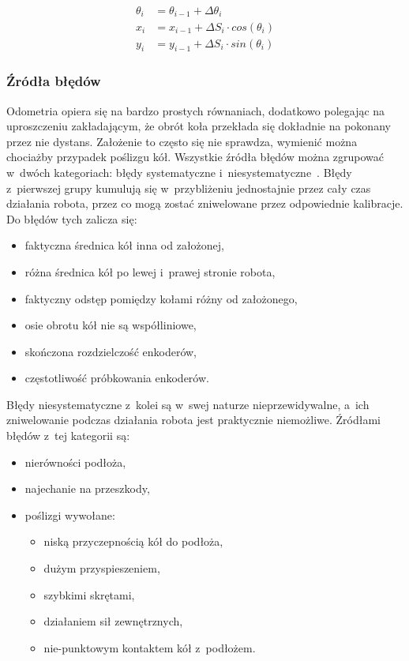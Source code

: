 \begin{align*}
\theta_i &= \theta_{i-1} + \Delta \theta_i \\
x_i &= x_{i-1} + \Delta S_i \cdot cos(\theta_i) \\
y_i &= y_{i-1} + \Delta S_i \cdot sin(\theta_i)
\end{align*}


\subsubsection{Źródła błędów}

Odometria opiera się na bardzo prostych równaniach, dodatkowo polegając na
uproszczeniu zakładającym, że obrót koła przekłada się dokładnie na pokonany
przez nie dystans. Założenie to często się nie sprawdza, wymienić można
chociażby przypadek poślizgu kół. Wszystkie źródła błędów można zgrupować 
w~dwóch kategoriach: błędy systematyczne i~niesystematyczne~\cite{whereami}.
Błędy z~pierwszej grupy kumulują się w~przybliżeniu jednostajnie przez cały czas
działania robota, przez co mogą zostać zniwelowane przez odpowiednie kalibracje.
Do błędów tych zalicza się:
\begin{itemize}
  \item faktyczna średnica kół inna od założonej,
  \item różna średnica kół po lewej i~prawej stronie robota,
  \item faktyczny odstęp pomiędzy kołami różny od założonego,
  \item osie obrotu kół nie są współliniowe,
  \item skończona rozdzielczość enkoderów,
  \item częstotliwość próbkowania enkoderów.
\end{itemize}

Błędy niesystematyczne z~kolei są w~swej naturze nieprzewidywalne, a~ich
zniwelowanie podczas działania robota jest praktycznie niemożliwe. Źródłami
błędów z~tej kategorii są:
\begin{itemize}
  \item nierówności podłoża,
  \item najechanie na przeszkody,
  \item poślizgi wywołane:
  \begin{itemize}
    \item niską przyczepnością kół do podłoża,
    \item dużym przyspieszeniem,
    \item szybkimi skrętami,
    \item działaniem sił zewnętrznych,
    \item nie-punktowym kontaktem kół z~podłożem.
  \end{itemize}
\end{itemize}

